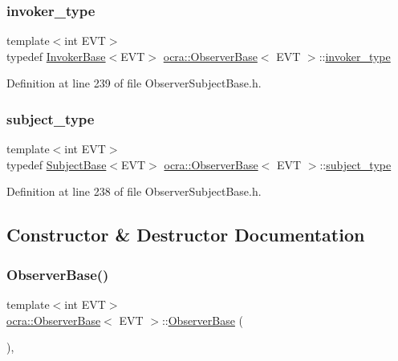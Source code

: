 \subsubsection{\texorpdfstring{invoker\+\_\+type}{invoker\_type}}
{\footnotesize\ttfamily template$<$int E\+VT$>$ \\
typedef \hyperlink{classocra_1_1InvokerBase}{Invoker\+Base}$<$E\+VT$>$ \hyperlink{classocra_1_1ObserverBase}{ocra\+::\+Observer\+Base}$<$ E\+VT $>$\+::\hyperlink{classocra_1_1ObserverBase_ad31fb33848323db6c887427f7dbf5c42}{invoker\+\_\+type}\hspace{0.3cm}{\ttfamily [protected]}}



Definition at line 239 of file Observer\+Subject\+Base.\+h.

\hypertarget{classocra_1_1ObserverBase_a4037f8722d9842eae6f6dd5648b9ce7f}{}\label{classocra_1_1ObserverBase_a4037f8722d9842eae6f6dd5648b9ce7f} 
\subsubsection{\texorpdfstring{subject\+\_\+type}{subject\_type}}
{\footnotesize\ttfamily template$<$int E\+VT$>$ \\
typedef \hyperlink{classocra_1_1SubjectBase}{Subject\+Base}$<$E\+VT$>$ \hyperlink{classocra_1_1ObserverBase}{ocra\+::\+Observer\+Base}$<$ E\+VT $>$\+::\hyperlink{classocra_1_1ObserverBase_a4037f8722d9842eae6f6dd5648b9ce7f}{subject\+\_\+type}\hspace{0.3cm}{\ttfamily [protected]}}



Definition at line 238 of file Observer\+Subject\+Base.\+h.



\subsection{Constructor \& Destructor Documentation}
\hypertarget{classocra_1_1ObserverBase_aafa4d4e56d4849a38915b4803d869a8f}{}\label{classocra_1_1ObserverBase_aafa4d4e56d4849a38915b4803d869a8f} 
\subsubsection{\texorpdfstring{Observer\+Base()}{ObserverBase()}}
{\footnotesize\ttfamily template$<$int E\+VT$>$ \\
\hyperlink{classocra_1_1ObserverBase}{ocra\+::\+Observer\+Base}$<$ E\+VT $>$\+::\hyperlink{classocra_1_1ObserverBase}{Observer\+Base} (\begin{DoxyParamCaption}{ }\end{DoxyParamCaption})\hspace{0.3cm}{\ttfamily [inline]}, {\ttfamily [protected]}}



